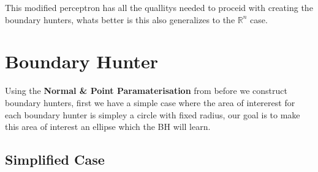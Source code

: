\documentclass{article}
\begin{document}
This modified perceptron has all the quallitys needed to proceid with creating the boundary hunters, whats better is this also generalizes to the $\mathbb{R}^n$ case.

\section{Boundary Hunter}
Using the \textbf{Normal \& Point Paramaterisation} from before we construct boundary hunters, first we have a simple case where the area of intererest for each boundary hunter is simpley a circle with fixed radius, our goal is to make this area of interest an ellipse which the BH will learn.

\subsection{Simplified Case}
\end{document}
